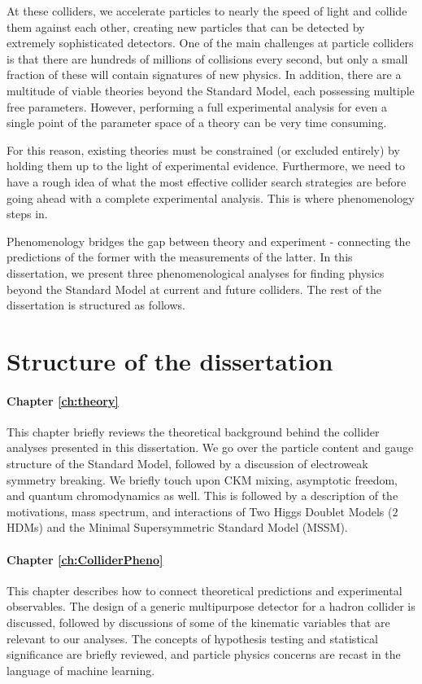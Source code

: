 At these colliders, we accelerate particles to nearly the speed of light and collide them against each other, creating new particles that can be detected by extremely sophisticated detectors. One of the main challenges at particle colliders is that there are hundreds of millions of collisions every second, but only a small fraction of these will contain signatures of new physics. In addition, there are a multitude of viable theories beyond the Standard Model, each possessing multiple free parameters. However, performing a full experimental analysis for even a single point of the parameter space of a theory can be very time consuming.

For this reason, existing theories must be constrained (or excluded entirely) by holding them up to the light of experimental evidence. Furthermore, we need to have a rough idea of what the most effective collider search strategies are before going ahead with a complete experimental analysis. This is where phenomenology steps in.

Phenomenology bridges the gap between theory and experiment - connecting the predictions of the former with the measurements of the latter. In this dissertation, we present three phenomenological analyses for finding physics beyond the Standard Model at current and future colliders. The rest of the dissertation is structured as follows.

\section{Structure of the dissertation}
\paragraph{Chapter \ref{ch:theory}} This chapter briefly reviews the theoretical background behind the collider analyses presented in this dissertation. We go over the particle content and gauge structure of the Standard Model, followed by a discussion of electroweak symmetry breaking. We briefly touch upon CKM mixing, asymptotic freedom, and quantum chromodynamics as well. This is followed by a description of the motivations, mass spectrum, and interactions of Two Higgs Doublet Models ($2$HDMs) and the Minimal Supersymmetric Standard Model (MSSM).

\paragraph{Chapter \ref{ch:ColliderPheno}} This chapter describes how to connect theoretical predictions and experimental observables. The design of a generic multipurpose detector for a hadron collider is discussed, followed by discussions of some of the kinematic variables that are relevant to our analyses. The concepts of hypothesis testing and statistical significance are briefly reviewed, and particle physics concerns are recast in the language of machine learning.

